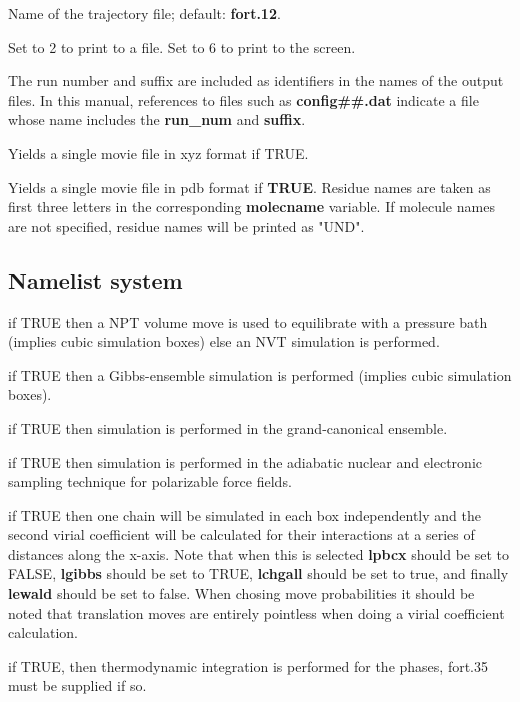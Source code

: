 \documentclass[12pt,letterpaper]{article}
\begin{document}
 Name of the trajectory file;
default: \textbf{fort.12}.

 Set to 2 to print to a file. Set
to 6 to print to the screen.

 The run number and suffix
are included as identifiers in the names of the output
files. In this manual, references to files such as {\bf
  config\#\#.dat} indicate a file whose name includes the
{\bf run\_num} and {\bf suffix}.

 Yields a single movie file in
xyz format if TRUE.

 Yields a single movie file in
pdb format if \textbf{TRUE}. Residue names are taken as first three
letters in the corresponding {\bf molecname} variable. If
molecule names are not specified, residue names will be
printed as "UND".

\subsection{Namelist \textbf{system}}
 if TRUE then a NPT volume move is used
to equilibrate with a pressure bath (implies cubic
simulation boxes) else an NVT simulation is performed.

 if TRUE then a Gibbs-ensemble
simulation is performed (implies cubic simulation boxes).

 if TRUE then simulation is performed
in the grand-canonical ensemble.

 if TRUE then simulation is performed in
the adiabatic nuclear and electronic sampling technique for
polarizable force fields.

 if TRUE then one chain will be
simulated in each box independently and the second virial
coefficient will be calculated for their interactions at a
series of distances along the x-axis. Note that when this is
selected {\bf lpbcx} should be set to FALSE, {\bf lgibbs}
should be set to TRUE, {\bf lchgall} should be set to true,
and finally {\bf lewald} should be set to false. When chosing
move probabilities it should be noted that translation moves
are entirely pointless when doing a virial coefficient
calculation.

 if TRUE, then thermodynamic
integration is performed for the phases, fort.35 must be
supplied if so.
\end{document}
